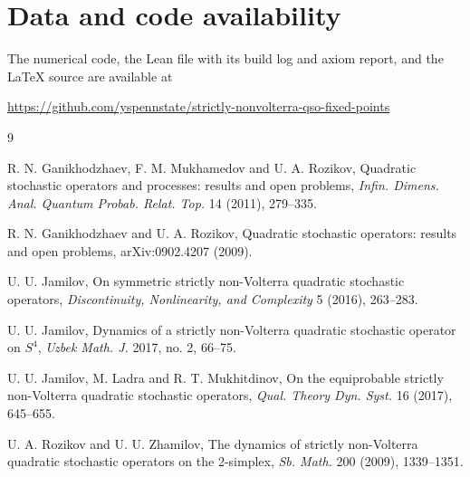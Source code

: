 \documentclass[11pt]{amsart}
\theoremstyle{definition}
\begin{document}
\section*{Data and code availability}
The numerical code, the Lean file with its build log and axiom report, and the \LaTeX{} source are available at
\begin{center}
\url{https://github.com/yspennstate/strictly-nonvolterra-qso-fixed-points}
\end{center}

\begin{thebibliography}{9}

 R. N. Ganikhodzhaev, F. M. Mukhamedov and U. A. Rozikov, Quadratic stochastic operators and processes: results and open problems, \emph{Infin. Dimens. Anal. Quantum Probab. Relat. Top.} 14 (2011), 279--335.

 R. N. Ganikhodzhaev and U. A. Rozikov, Quadratic stochastic operators: results and open problems, arXiv:0902.4207 (2009).

 U. U. Jamilov, On symmetric strictly non-Volterra quadratic stochastic operators, \emph{Discontinuity, Nonlinearity, and Complexity} 5 (2016), 263--283.

 U. U. Jamilov, Dynamics of a strictly non-Volterra quadratic stochastic operator on $S^4$, \emph{Uzbek Math. J.} 2017, no. 2, 66--75.

 U. U. Jamilov, M. Ladra and R. T. Mukhitdinov, On the equiprobable strictly non-Volterra quadratic stochastic operators, \emph{Qual. Theory Dyn. Syst.} 16 (2017), 645--655.

 U. A. Rozikov and U. U. Zhamilov, The dynamics of strictly non-Volterra quadratic stochastic operators on the 2-simplex, \emph{Sb. Math.} 200 (2009), 1339--1351.

\end{thebibliography}
\end{document}
